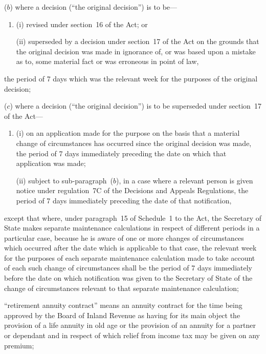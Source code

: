 \documentclass[12pt,a4paper]{article}
\begin{document}
\begin{enumerate}
\begin{enumerate}
($b$) 
where a decision (“the original decision”) is to be—
\begin{enumerate}\item[]
(i)
revised under section~16 of the Act; or

(ii)
superseded by a decision under section~17 of the Act on the grounds that the original decision was made in ignorance of, or was based upon a mistake as to, some material fact or was erroneous in point of law,
\end{enumerate}
the period of 7 days which was the relevant week for the purposes of the original decision;

($c$) 
where a decision (“the original decision”) is to be superseded under section~17 of the Act—
\begin{enumerate}\item[]
(i)
on an application made for the purpose on the basis that a material change of circumstances has occurred since the original decision was made, the period of 7 days immediately preceding the date on which that application was made;

(ii)
subject to sub-paragraph~($b$), in a case where a relevant person is given notice under regulation~7C of the Decisions and Appeals Regulations, the period of 7 days immediately preceding the date of that notification,
\end{enumerate}
except that where, under paragraph~15 of Schedule~1 to the Act, the Secretary of State makes separate maintenance calculations in respect of different periods in a particular case, because he is aware of one or more changes of circumstances which occurred after the date which is applicable to that case, the relevant week for the purposes of each separate maintenance calculation made to take account of each such change of circumstances shall be the period of 7 days immediately before the date on which notification was given to the Secretary of State of the change of circumstances relevant to that separate maintenance calculation;
\end{enumerate}


“retirement annuity contract” means an annuity contract for the time being approved by the Board of Inland Revenue as having for its main object the provision of a life annuity in old age or the provision of an annuity for a partner or dependant and in respect of which relief from income tax may be given on any premium;


\end{enumerate}
\end{document}
